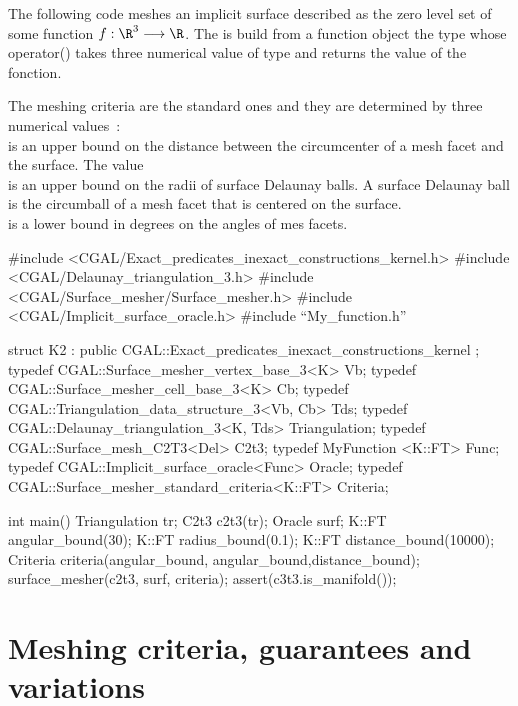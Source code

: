The following code meshes an implicit surface described as the zero level
set of some function $f : \R^3 \longrightarrow \R$.
The   is build from 
a function object
the type  whose operator()
takes three numerical value of type 
and returns the value of the fonction.

The meshing criteria are the standard ones
and they are determined  by three numerical
values~: \\ 
 is an upper bound on the distance 
between the circumcenter of a mesh facet and the surface.
The value \\
 is an upper bound on the radii of surface Delaunay
balls. A surface Delaunay ball is the circumball of  a mesh facet
that is centered on the surface. \\
 is a lower bound in degrees on the angles of mes facets.

\begin{ccExampleCode}

#include <CGAL/Exact_predicates_inexact_constructions_kernel.h>
#include <CGAL/Delaunay_triangulation_3.h>
#include <CGAL/Surface_mesher/Surface_mesher.h>
#include <CGAL/Implicit_surface_oracle.h>
#include ``My_function.h''

struct K2 : public CGAL::Exact_predicates_inexact_constructions_kernel {};
typedef CGAL::Surface_mesher_vertex_base_3<K> Vb;
typedef CGAL::Surface_mesher_cell_base_3<K> Cb;
typedef CGAL::Triangulation_data_structure_3<Vb, Cb> Tds;
typedef CGAL::Delaunay_triangulation_3<K, Tds> Triangulation;
typedef CGAL::Surface_mesh_C2T3<Del> C2t3;
typedef MyFunction <K::FT> Func;
typedef CGAL::Implicit_surface_oracle<Func>  Oracle;
typedef  CGAL::Surface_mesher_standard_criteria<K::FT> Criteria;

int main() {
     Triangulation tr;
     C2t3      c2t3(tr);
     Oracle    surf;
     K::FT     angular_bound(30);
     K::FT     radius_bound(0.1);
     K::FT     distance_bound(10000);
     Criteria  criteria(angular_bound, angular_bound,distance_bound);
     surface_mesher(c2t3, surf, criteria);
     assert(c3t3.is_manifold());
}

\end{ccExampleCode}


\section{Meshing criteria, guarantees and variations}
\label{SurfaceMesher_section_criteria}

